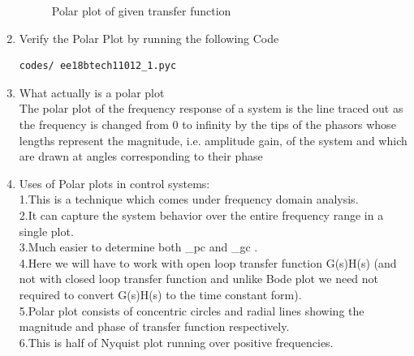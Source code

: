 \begin{enumerate}[label=\thesection.\arabic*.,ref=\thesection.\theenumi]
\begin{figure}
    \caption{Polar plot of given transfer function}
    \label{fig:Graph}
\end{figure}
\item
Verify the Polar Plot by running the following Code\\
\begin{lstlisting}
codes/ ee18btech11012_1.pyc
\end{lstlisting}
\item
What actually is a polar plot\\
The polar plot of the frequency response of a system is the line traced out as the frequency is changed from 0 to infinity by the tips of the phasors whose lengths represent the magnitude, i.e. amplitude gain, of the system and which are drawn at angles corresponding to their phase 
\item
Uses of Polar plots in control systems:\\
1.This is a technique which comes under frequency domain analysis.\\
2.It can capture the system behavior over the entire frequency range in a single plot.\\
3.Much easier to determine both \omega_{pc} and \omega_{gc} .\\


4.Here we will have to work with open loop transfer function G(s)H(s) (and not with closed loop transfer function and unlike Bode plot we need not required to convert G(s)H(s) to the time constant form).\\

5.Polar plot consists of concentric circles and radial lines showing the magnitude and phase of transfer function respectively.\\

6.This is half of Nyquist plot running over positive frequencies.\\


\end{enumerate}
